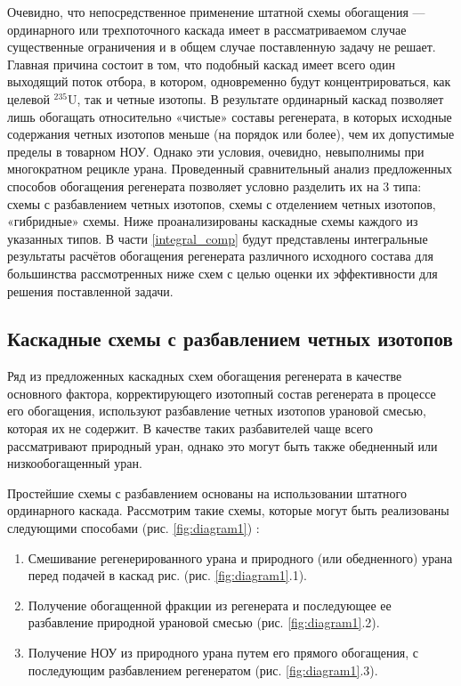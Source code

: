 Очевидно, что непосредственное применение штатной схемы обогащения --- ординарного или трехпоточного каскада имеет в рассматриваемом случае существенные ограничения и в общем случае поставленную задачу не решает. Главная причина состоит в том, что подобный каскад имеет всего один выходящий поток отбора, в котором, одновременно будут концентрироваться, как целевой  $^{235}$U, так и четные изотопы. В результате ординарный каскад позволяет лишь обогащать относительно «чистые» составы регенерата, в которых исходные содержания четных изотопов меньше (на порядок или более), чем их допустимые пределы в товарном НОУ. Однако эти условия, очевидно, невыполнимы при многократном рецикле урана.
Проведенный сравнительный анализ предложенных способов обогащения регенерата позволяет условно разделить их на 3 типа: схемы с разбавлением четных изотопов,  схемы с отделением четных изотопов, «гибридные» схемы. 
Ниже проанализированы каскадные схемы каждого из указанных типов. В части \ref{integral_comp} будут представлены интегральные результаты расчётов обогащения регенерата различного исходного состава для большинства рассмотренных ниже схем с целью оценки их эффективности для решения поставленной задачи.

\subsection{Каскадные схемы с разбавлением четных изотопов}

Ряд из предложенных каскадных схем обогащения регенерата в качестве основного фактора, корректирующего изотопный состав регенерата в процессе его обогащения, используют разбавление четных изотопов урановой смесью, которая их не содержит. В качестве таких разбавителей чаще всего рассматривают природный уран, однако это могут быть также обедненный или низкообогащенный уран.

Простейшие схемы с разбавлением основаны на использовании штатного ординарного каскада. Рассмотрим такие схемы, которые могут быть реализованы следующими способами (рис. \ref{fig:diagram1}) \cite{ksenof88,borodynyaIssledovanieProblemyVovlecheniya1989,sulaberidzeNekotoryhRazdelitelnyhProblemah2004,smirnovKaskadnyeShemyZadachah2012}:

\begin{enumerate}
  \item Смешивание регенерированного урана и природного (или обедненного) урана перед подачей в каскад рис. (рис. \ref{fig:diagram1}.1).
  \item Получение обогащенной фракции из регенерата и последующее ее разбавление природной урановой смесью (рис. \ref{fig:diagram1}.2).
  \item Получение НОУ из природного урана путем его прямого обогащения, с последующим разбавлением регенератом (рис. \ref{fig:diagram1}.3).
\end{enumerate}

